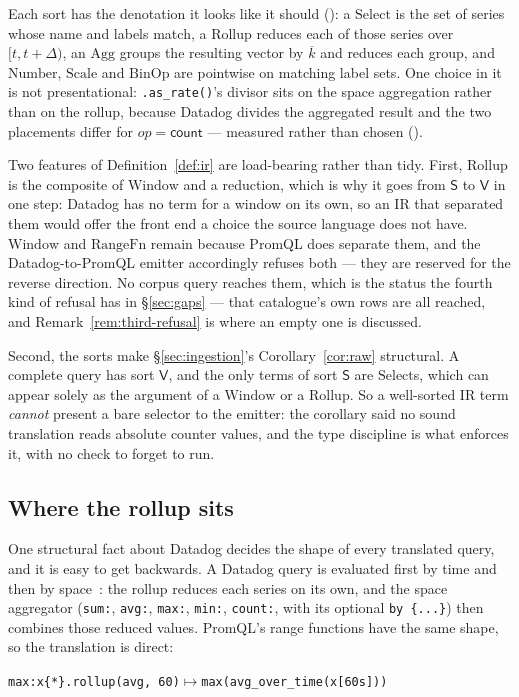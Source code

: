 Each sort has the denotation it looks like it should (): a
$\mathrm{Select}$ is the set of series whose name and labels match, a $\mathrm{Rollup}$
reduces each of those series over $[t,t+\Delta)$, an $\mathrm{Agg}$ groups the resulting
vector by $\overline{k}$ and reduces each group, and $\mathrm{Number}$, $\mathrm{Scale}$
and $\mathrm{BinOp}$ are pointwise on matching label sets. One choice in it is not
presentational: \texttt{.as\_rate()}'s divisor sits on the space aggregation rather than
on the rollup, because Datadog divides the aggregated result and the two placements
differ for $\mathit{op}=\mathsf{count}$ --- measured rather than chosen
().

\iffull\fi

\inlineonly{\noindent}%
Two features of Definition~\ref{def:ir} are load-bearing rather than tidy. First,
$\mathrm{Rollup}$ is the composite of $\mathrm{Window}$ and a reduction, which is why it
goes from $\mathsf{S}$ to $\mathsf{V}$ in one step: Datadog has no term for a window on
its own, so an IR that separated them would offer the front end a choice the source
language does not have. $\mathrm{Window}$ and $\mathrm{RangeFn}$ remain because PromQL
does separate them, and the Datadog-to-PromQL emitter accordingly refuses both --- they
are reserved for the reverse direction. No corpus query reaches them, which is the
status the fourth kind of refusal has in \S\ref{sec:gaps} --- that catalogue's own rows
are all reached, and Remark~\ref{rem:third-refusal} is where an empty one is discussed.

Second, the sorts make \S\ref{sec:ingestion}'s Corollary~\ref{cor:raw} structural.
A complete query has sort $\mathsf{V}$, and the only terms of sort $\mathsf{S}$ are
$\mathrm{Select}$s, which can appear solely as the argument of a $\mathrm{Window}$ or a
$\mathrm{Rollup}$. So a well-sorted IR term \emph{cannot} present a bare selector to the
emitter: the corollary said no sound translation reads absolute counter values, and the
type discipline is what enforces it, with no check to forget to run.

\subsection{Where the rollup sits}
\label{sec:rollup-order}
One structural fact about Datadog decides the shape of every translated query, and it is
easy to get backwards. A Datadog query is evaluated first by time and then by
space~\citep{ddnested}: the rollup reduces each series on its own, and the space
aggregator (\texttt{sum:}, \texttt{avg:}, \texttt{max:}, \texttt{min:},
\texttt{count:}, with its optional \texttt{by \{...\}}) then combines those reduced
values. PromQL's range functions have the same shape, so the translation is direct:
\begin{center}\footnotesize
\texttt{max:x\{*\}.rollup(avg, 60)}\quad$\longmapsto$\quad\texttt{max(avg\_over\_time(x[60s]))}
\end{center}

